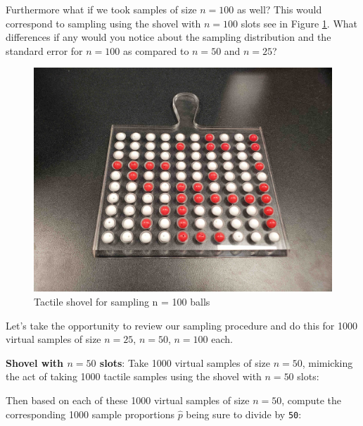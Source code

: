 \documentclass[12pt,]{krantz}
\makeatletter
\newenvironment{Shaded}{\begin{snugshade}}{\end{snugshade}}
\newcommand{\KeywordTok}[1]{\textcolor[rgb]{0.27,0.27,0.27}{\textbf{#1}}}
\newcommand{\DataTypeTok}[1]{\textcolor[rgb]{0.27,0.27,0.27}{#1}}
\newcommand{\DecValTok}[1]{\textcolor[rgb]{0.06,0.06,0.06}{#1}}
\newcommand{\StringTok}[1]{\textcolor[rgb]{0.5,0.5,0.5}{#1}}
\newcommand{\OperatorTok}[1]{\textcolor[rgb]{0.43,0.43,0.43}{\textbf{#1}}}
\newcommand{\NormalTok}[1]{#1}
\newenvironment{kframe}{%
\medskip{}
\setlength{\fboxsep}{.8em}
 \def\at@end@of@kframe{}%
 \ifinner\ifhmode%
  \def\at@end@of@kframe{\end{minipage}}%
  \begin{minipage}{\columnwidth}%
 \fi\fi%
 \def\FrameCommand##1{\hskip\@totalleftmargin \hskip-\fboxsep
 \colorbox{shadecolor}{##1}\hskip-\fboxsep
     \hskip-\linewidth \hskip-\@totalleftmargin \hskip\columnwidth}%
 \MakeFramed {\advance\hsize-\width
   \@totalleftmargin\z@ \linewidth\hsize
   \@setminipage}}%
 {\par\unskip\endMakeFramed%
 \at@end@of@kframe}
\renewenvironment{Shaded}{\begin{kframe}}{\end{kframe}}
\makeatother
\begin{document}
Furthermore what if we took samples of size \(n=100\) as well? This
would correspond to sampling using the shovel with \(n=100\) slots see
in Figure \ref{fig:shovel-n-100}. What differences if any would you
notice about the sampling distribution and the standard error for
\(n=100\) as compared to \(n=50\) and \(n=25\)?

\begin{figure}

{\centering \includegraphics[width=0.8\linewidth]{images/sampling/shovel_100} 

}

\caption{Tactile shovel for sampling n = 100 balls}\label{fig:shovel-n-100}
\end{figure}

Let's take the opportunity to review our sampling procedure and do this
for 1000 virtual samples of size \(n=25\), \(n=50\), \(n=100\) each.

\textbf{Shovel with \(n=50\) slots}: Take 1000 virtual samples of size
\(n=50\), mimicking the act of taking 1000 tactile samples using the
shovel with \(n=50\) slots:

\begin{Shaded}
\end{Shaded}

Then based on each of these 1000 virtual samples of size \(n=50\),
compute the corresponding 1000 sample proportions \(\widehat{p}\) being
sure to divide by \texttt{50}:
\end{document}
